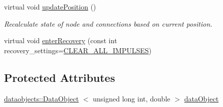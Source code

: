 \begin{DoxyCompactItemize}
virtual void \hyperlink{classcryomesh_1_1components_1_1Node_ab769e1efe1fd3e0ae9ff0a7643dd473c}{update\-Position} ()
\begin{DoxyCompactList}\small\item\em \-Recalculate state of node and connections based on current position. \end{DoxyCompactList}\item 
virtual void \hyperlink{classcryomesh_1_1components_1_1Node_a92bbb37859ba4b810381bd733ad5d63c}{enter\-Recovery} (const int recovery\-\_\-settings=\hyperlink{classcryomesh_1_1components_1_1Node_adf36d853022d1b106766aefd3b9f3641a91a2a1e92850c99a22afb1574bd74574}{\-C\-L\-E\-A\-R\-\_\-\-A\-L\-L\-\_\-\-I\-M\-P\-U\-L\-S\-E\-S})
\end{DoxyCompactItemize}
\subsection*{\-Protected \-Attributes}
\begin{DoxyCompactItemize}
\item 
\hyperlink{classcryomesh_1_1dataobjects_1_1DataObject}{dataobjects\-::\-Data\-Object}\*
$<$ unsigned long int, double $>$ \hyperlink{classcryomesh_1_1dataobjects_1_1DataObjectController_aa13d30e9fa2f1caa0510635214d4bb26}{data\-Object}
\end{DoxyCompactItemize}
